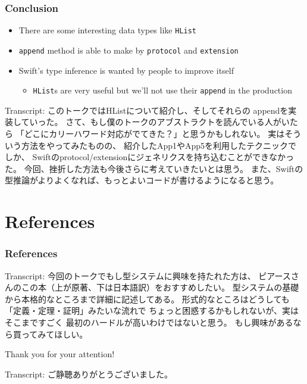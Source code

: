 \begin{frame}[fragile]
  \frametitle{Conclusion}

  \pause
  \begin{itemize}
    \item<+-> There are some interesting data types like \lstinline|HList|

    \item<+-> \lstinline|append| method is able to make by
    \lstinline|protocol| and \lstinline|extension|

    \item<+-> Swift's type inference is wanted by people to
    improve itself
    \begin{itemize}
      \item \lstinline|HList|s are very useful
      but we'll not use their \lstinline|append| in the production
    \end{itemize}
  \end{itemize}

  \begin{notes}
    \item Transcript:
    このトークではHListについて紹介し、そしてそれらの
    appendを実装していった。
    さて、もし僕のトークのアブストラクトを読んでいる人がいたら
    「どこにカリーハワード対応がでてきた？」と思うかもしれない。
    実はそういう方法をやってみたものの、
    紹介したApp1やApp5を利用したテクニックでしか、
    Swiftのprotocol/extensionにジェネリクスを持ち込むことができなかった。
    今回、挫折した方法も今後さらに考えていきたいとは思う。
    また、Swiftの型推論がよりよくなれば、もっとよいコードが書けるようになると思う。
  \end{notes}
\end{frame}

\section*{References}

\begin{frame}
  \frametitle{References}

  
  \nocite{*}
  

  \begin{notes}
    \item Transcript:
    今回のトークでもし型システムに興味を持たれた方は、
    ピアースさんのこの本（上が原著、下は日本語訳）をおすすめしたい。
    型システムの基礎から本格的なところまで詳細に記述してある。
    形式的なところはどうしても「定義・定理・証明」みたいな流れで
    ちょっと困惑するかもしれないが、実はそこまですごく
    最初のハードルが高いわけではないと思う。
    もし興味があるなら買ってみてほしい。
  \end{notes}
\end{frame}

\begin{frame}
  \centering
  {\Huge Thank you for your attention!}

  \begin{notes}
    \item Transcript:
    ご静聴ありがとうございました。
  \end{notes}
\end{frame}


